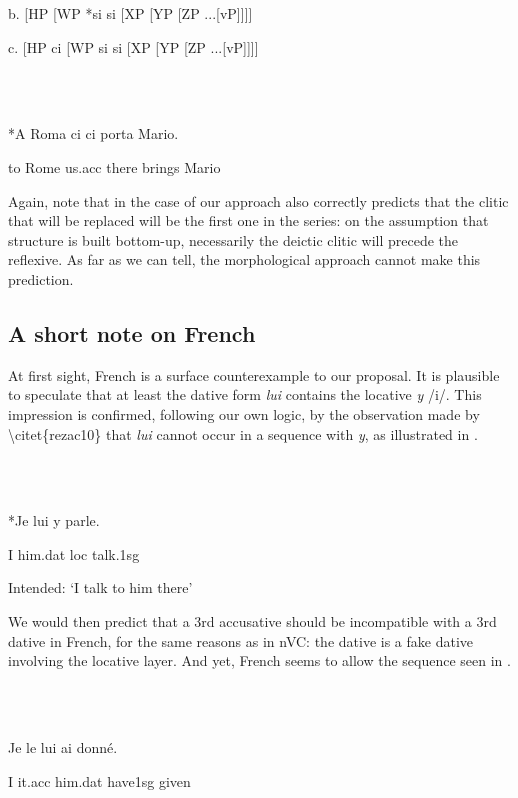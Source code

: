 \documentclass[output=paper,modfonts,nonflat]{langsci/langscibook}
\begin{document}
  b. [HP    [WP *si si  [XP    [YP    [ZP    ...[vP]]]]

  c. [HP  ci  [WP   si si  [XP    [YP    [ZP    ...[vP]]]]

\ea%
    \label{ex:key:28}
    \gll\\
        \\
    \glt
    \z

        *A Roma  ci  ci   porta   Mario.

      to Rome  us.acc  there  brings  Mario

Again, note that in the case of  our approach also correctly predicts that the clitic that will be replaced will be the first one in the series: on the assumption that structure is built bottom-up, necessarily the deictic clitic will precede the reflexive. As far as we can tell, the morphological approach cannot make this prediction.

\subsection{A short note on French} %

At first sight, French is a surface counterexample to our proposal. It is plausible to speculate that at least the dative form \textit{lui} contains the locative \textit{y} /i/. This impression is confirmed, following our own logic, by the observation made by {\textbackslash}citet\{rezac10\} that \textit{lui} cannot occur in a sequence with \textit{y}, as illustrated in .

\ea%
    \label{ex:key:29}
    \gll\\
        \\
    \glt
    \z

        *Je   lui     y   parle.

    I  him.dat  loc  talk.1sg

  Intended: ‘I talk to him there’

We would then predict that a 3rd accusative should be incompatible with a 3rd dative in French, for the same reasons as in nVC: the dative is a fake dative involving the locative layer. And yet, French seems to allow the sequence seen in .

\ea%
    \label{ex:key:30}
    \gll\\
        \\
    \glt
    \z

         Je le     lui    ai     donné.

  I   it.acc  him.dat  have1sg  given
\end{document}
